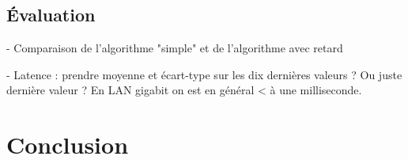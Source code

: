 \documentclass{article}
\begin{document}
\subsection{Évaluation}
- Comparaison de l'algorithme "simple" et de l'algorithme avec retard


- Latence : prendre moyenne et écart-type sur les dix dernières valeurs ? Ou juste dernière valeur ?
En LAN gigabit on est en général < à une milliseconde.

\section{Conclusion}



\printbibliography 
\end{document}

